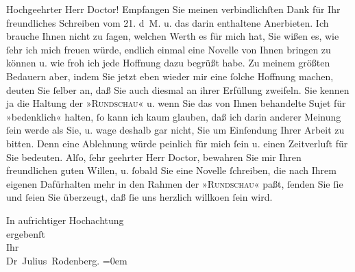 \pstart{}Hochgeehrter Herr Doctor!\pend\vspace{0.5em}
\pstart
           Empfangen Sie meinen verbindlichſten Dank für Ihr freundliches Schreiben vom
                  21. d M. u. das darin enthaltene Anerbieten. Ich brauche Ihnen nicht
               zu ſagen, welchen Werth es für mich hat, Sie wißen es, wie ſehr ich mich freuen
               würde, endlich einmal eine Novelle von Ihnen bringen zu können u. wie froh ich jede Hoffnung dazu
               begrüßt habe. Zu meinem größten Bedauern aber, indem Sie jetzt eben wieder mir eine
               ſolche Hoffnung machen, deuten Sie ſelber an, daß Sie auch diesmal an ihrer Erfüllung
               zweifeln. Sie kennen ja die Haltung der »\textsc{Rundschau}« u. wenn Sie das von Ihnen behandelte Sujet für »bedenklich« halten, ſo kann
               ich kaum glauben, daß ich darin anderer Meinung ſein werde als Sie, u. wage deshalb
                  {\pb}gar nicht, Sie um
               Einſendung Ihrer Arbeit zu
               bitten. Denn eine Ablehnung würde peinlich für mich ſein u. einen Zeitverluſt für Sie
               bedeuten. Alſo, ſehr geehrter Herr Doctor, bewahren Sie mir Ihren freundlichen guten
               Willen, u. ſobald Sie eine Novelle ſchreiben, die nach Ihrem eigenen Dafürhalten mehr
               in den Rahmen der »\textsc{Rundschau}« paßt, ſenden Sie ſie und ſeien Sie überzeugt, daß ſie uns herzlich willko{\geminationm}en ſein wird.\pend
           
\pstart
           In aufrichtiger Hochachtung{\\[\baselineskip]}ergebenſt{\\[\baselineskip]}Ihr{\\[\baselineskip]}\spacefill\mbox{Dr Julius Rodenberg.}\pend
           \leftskip=0em{}\endnumbering{}  
      